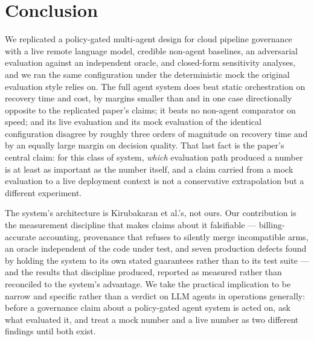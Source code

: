 \section{Conclusion}\label{sec:conclusion}

We replicated a policy-gated multi-agent design for cloud pipeline governance with a live remote
language model, credible non-agent baselines, an adversarial evaluation against an independent oracle,
and closed-form sensitivity analyses, and we ran the same configuration under the deterministic mock
the original evaluation style relies on. The full agent system does beat static orchestration on
recovery time and cost, by margins smaller than and in one case directionally opposite to the
replicated paper's claims; it beats no non-agent comparator on speed; and its live evaluation and its
mock evaluation of the identical configuration disagree by roughly three orders of magnitude on
recovery time and by an equally large margin on decision quality. That last fact is the paper's
central claim: for this class of system, \emph{which} evaluation path produced a number is at least as
important as the number itself, and a claim carried from a mock evaluation to a live deployment
context is not a conservative extrapolation but a different experiment.

The system's architecture is Kirubakaran et al.'s, not ours. Our contribution is the measurement
discipline that makes claims about it falsifiable --- billing-accurate accounting, provenance that
refuses to silently merge incompatible arms, an oracle independent of the code under test, and seven
production defects found by holding the system to its own stated guarantees rather than to its test
suite --- and the results that discipline produced, reported as measured rather than reconciled to the
system's advantage. We take the practical implication to be narrow and specific rather than a verdict
on LLM agents in operations generally: before a governance claim about a policy-gated agent system is
acted on, ask what evaluated it, and treat a mock number and a live number as two different findings
until both exist.
